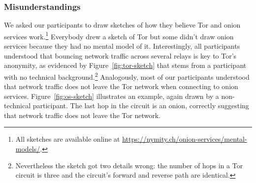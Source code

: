 \subsubsection{Misunderstandings}

We asked our participants to draw sketches of how they believe Tor and onion
services work.\footnote{All sketches are available online at
\url{https://nymity.ch/onion-services/mental-models/}.}   Everybody drew a
sketch of Tor but some didn't draw onion services because they had no mental
model of it.  Interestingly, all participants understood that bouncing network
traffic across several relays is key to Tor's anonymity, as evidenced by
Figure~\ref{fig:tor-sketch} that stems from a participant with no technical
background.\footnote{Nevertheless the sketch got two details wrong: the number
of hops in a Tor circuit is three and the circuit's forward and reverse path are
identical.}  Analogously, most of our participants understood that network
traffic does not leave the Tor network when connecting to onion services.
Figure~\ref{fig:os-sketch} illustrates an example, again drawn by a
non-technical participant.  The last hop in the circuit is an onion, correctly
suggesting that network traffic does not leave the Tor network.


